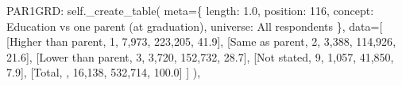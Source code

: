 \documentclass[
  11pt,
  a4paper,
]{article}
\newenvironment{Shaded}{\begin{snugshade}}{\end{snugshade}}
\newcommand{\NormalTok}[1]{\textcolor[rgb]{0.00,0.23,0.31}{#1}}
\newcommand{\OperatorTok}[1]{\textcolor[rgb]{0.37,0.37,0.37}{#1}}
\newcommand{\StringTok}[1]{\textcolor[rgb]{0.13,0.47,0.30}{#1}}
\newcommand{\VariableTok}[1]{\textcolor[rgb]{0.07,0.07,0.07}{#1}}
\begin{document}
\begin{Shaded}
\begin{Highlighting}[]
    \StringTok{\textquotesingle{}PAR1GRD\textquotesingle{}}\NormalTok{: }\VariableTok{self}\NormalTok{.\_create\_table(}
\NormalTok{        meta}\OperatorTok{=}\NormalTok{\{}
            \StringTok{\textquotesingle{}length\textquotesingle{}}\NormalTok{: }\StringTok{\textquotesingle{}1.0\textquotesingle{}}\NormalTok{, }\StringTok{\textquotesingle{}position\textquotesingle{}}\NormalTok{: }\StringTok{\textquotesingle{}116\textquotesingle{}}\NormalTok{,}
            \StringTok{\textquotesingle{}concept\textquotesingle{}}\NormalTok{: }\StringTok{\textquotesingle{}Education vs one parent (at graduation)\textquotesingle{}}\NormalTok{,}
            \StringTok{\textquotesingle{}universe\textquotesingle{}}\NormalTok{: }\StringTok{\textquotesingle{}All respondents\textquotesingle{}}
\NormalTok{        \},}
\NormalTok{        data}\OperatorTok{=}\NormalTok{[}
\NormalTok{            [}\StringTok{\textquotesingle{}Higher than parent\textquotesingle{}}\NormalTok{, }\StringTok{\textquotesingle{}1\textquotesingle{}}\NormalTok{, }\StringTok{\textquotesingle{}7,973\textquotesingle{}}\NormalTok{, }\StringTok{\textquotesingle{}223,205\textquotesingle{}}\NormalTok{, }\StringTok{\textquotesingle{}41.9\textquotesingle{}}\NormalTok{],}
\NormalTok{            [}\StringTok{\textquotesingle{}Same as parent\textquotesingle{}}\NormalTok{, }\StringTok{\textquotesingle{}2\textquotesingle{}}\NormalTok{, }\StringTok{\textquotesingle{}3,388\textquotesingle{}}\NormalTok{, }\StringTok{\textquotesingle{}114,926\textquotesingle{}}\NormalTok{, }\StringTok{\textquotesingle{}21.6\textquotesingle{}}\NormalTok{],}
\NormalTok{            [}\StringTok{\textquotesingle{}Lower than parent\textquotesingle{}}\NormalTok{, }\StringTok{\textquotesingle{}3\textquotesingle{}}\NormalTok{, }\StringTok{\textquotesingle{}3,720\textquotesingle{}}\NormalTok{, }\StringTok{\textquotesingle{}152,732\textquotesingle{}}\NormalTok{, }\StringTok{\textquotesingle{}28.7\textquotesingle{}}\NormalTok{],}
\NormalTok{            [}\StringTok{\textquotesingle{}Not stated\textquotesingle{}}\NormalTok{, }\StringTok{\textquotesingle{}9\textquotesingle{}}\NormalTok{, }\StringTok{\textquotesingle{}1,057\textquotesingle{}}\NormalTok{, }\StringTok{\textquotesingle{}41,850\textquotesingle{}}\NormalTok{, }\StringTok{\textquotesingle{}7.9\textquotesingle{}}\NormalTok{],}
\NormalTok{            [}\StringTok{\textquotesingle{}Total\textquotesingle{}}\NormalTok{, }\StringTok{\textquotesingle{}\textquotesingle{}}\NormalTok{, }\StringTok{\textquotesingle{}16,138\textquotesingle{}}\NormalTok{, }\StringTok{\textquotesingle{}532,714\textquotesingle{}}\NormalTok{, }\StringTok{\textquotesingle{}100.0\textquotesingle{}}\NormalTok{]}
\NormalTok{        ]}
\NormalTok{    ),}


\end{Highlighting}
\end{Shaded}
\end{document}
